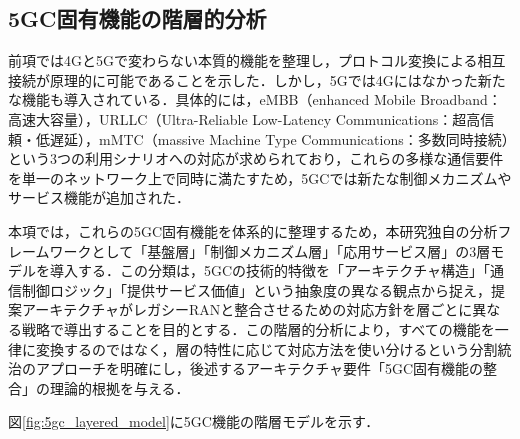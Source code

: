 \subsection{5GC固有機能の階層的分析}
\label{subsec:5gc_layered_design_framework}

前項では4Gと5Gで変わらない本質的機能を整理し，プロトコル変換による相互接続が原理的に可能であることを示した．しかし，5Gでは4Gにはなかった新たな機能も導入されている．具体的には，eMBB（enhanced Mobile Broadband：高速大容量），URLLC（Ultra-Reliable Low-Latency Communications：超高信頼・低遅延），mMTC（massive Machine Type Communications：多数同時接続）という3つの利用シナリオへの対応が求められており\cite{ITUR_M2083}，これらの多様な通信要件を単一のネットワーク上で同時に満たすため，5GCでは新たな制御メカニズムやサービス機能が追加された．

本項では，これらの5GC固有機能を体系的に整理するため，本研究独自の分析フレームワークとして「基盤層」「制御メカニズム層」「応用サービス層」の3層モデルを導入する．この分類は，5GCの技術的特徴を「アーキテクチャ構造」「通信制御ロジック」「提供サービス価値」という抽象度の異なる観点から捉え，提案アーキテクチャがレガシーRANと整合させるための対応方針を層ごとに異なる戦略で導出することを目的とする．この階層的分析により，すべての機能を一律に変換するのではなく，層の特性に応じて対応方法を使い分けるという分割統治のアプローチを明確にし，後述するアーキテクチャ要件「5GC固有機能の整合」の理論的根拠を与える．

図\ref{fig:5gc_layered_model}に5GC機能の階層モデルを示す．

